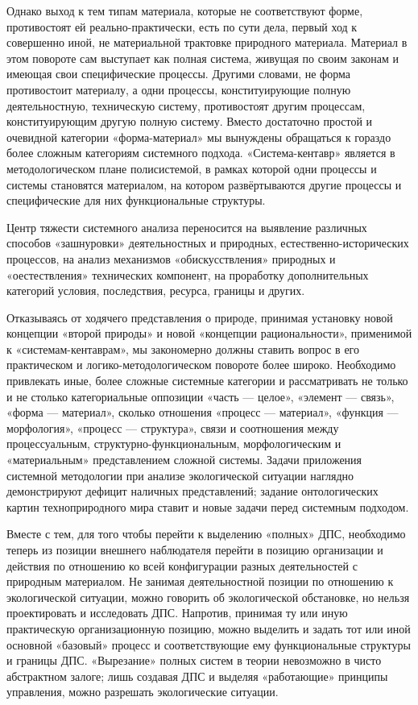 \documentclass[11pt,a4paper]{article}
\begin{document}
Однако выход к тем типам материала, которые не соответствуют форме,
противостоят ей реально-практически, есть по сути дела, первый ход к
совершенно иной, не материальной трактовке природного материала. Материал в
этом повороте сам выступает как полная система, живущая по своим законам и
имеющая свои специфические процессы. Другими словами, не форма противостоит
материалу, а одни процессы, конституирующие полную деятельностную, техническую
систему, противостоят другим процессам, конституирующим другую полную систему.
Вместо достаточно простой и очевидной категории «форма-материал» мы вынуждены
обращаться к гораздо более сложным категориям системного подхода.
«Система-кентавр» является в методологическом плане полисистемой, в рамках
которой одни процессы и системы становятся материалом, на котором
развёртываются другие процессы и специфические для них функциональные
структуры.

Центр тяжести системного анализа переносится на выявление различных способов
«зашнуровки» деятельностных и природных, естественно-исторических процессов,
на анализ механизмов «обискусствления» природных и «оестествления» технических
компонент, на проработку дополнительных категорий условия, последствия,
ресурса, границы и других. 

Отказываясь от ходячего представления о природе, принимая установку новой
концепции «второй природы» и новой «концепции рациональности», применимой к
«системам-кентаврам», мы закономерно должны ставить вопрос в его практическом
и логико-методо\-логическом повороте более широко. Необходимо привлекать иные,
более сложные системные категории и рассматривать не только и не столько
категориальные оппозиции «часть — целое», «элемент — связь», «форма —
материал», сколько отношения «процесс — материал», «функция — морфология»,
«процесс — структура», связи и соотношения между процессуальным,
структурно-функциональным, морфологическим и «материальным» представлением
сложной системы. Задачи приложения системной методологии при анализе
экологической ситуации наглядно демонстрируют дефицит наличных представлений;
задание онтологических картин техноприродного мира ставит и новые задачи перед
системным подходом. 

Вместе с тем, для того чтобы перейти к выделению «полных» ДПС, необходимо
теперь из позиции внешнего наблюдателя перейти в позицию организации и
действия по отношению ко всей конфигурации разных деятельностей с природным
материалом. Не занимая деятельностной позиции по отношению к экологической
ситуации, можно говорить об экологической обстановке, но нельзя проектировать
и исследовать ДПС. Напротив, принимая ту или иную практическую организационную
позицию, можно выделить и задать тот или иной основной «базовый» процесс и
соответствующие ему функциональные структуры и границы ДПС. «Вырезание» полных
систем в теории невозможно в чисто абстрактном залоге; лишь создавая ДПС и
выделяя «работающие» принципы управления, можно разрешать экологические
ситуации. 
\end{document}
